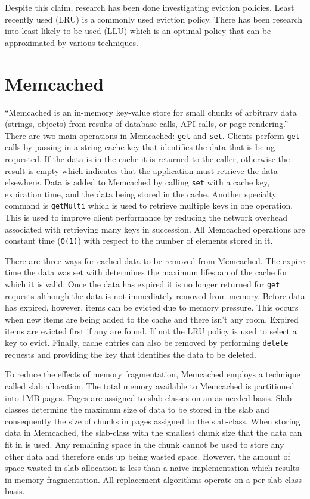 \documentclass[12pt]{ucthesis}
\begin{document}
Despite this claim, research has been done investigating eviction policies.
Least recently used (LRU) is a commonly used eviction policy.
There has been research into least likely to be used (LLU) which is an optimal policy that can be approximated by various techniques.


\section{Memcached}
``Memcached is an in-memory key-value store for small chunks of arbitrary data (strings, objects) from results of database calls, API calls, or page rendering.''\cite{memcachedDotOrg}
There are two main operations in Memcached: {\tt get} and {\tt set}.
Clients perform {\tt get} calls by passing in a string cache key that identifies the data that is being requested.
If the data is in the cache it is returned to the caller, otherwise the result is empty which indicates that the application must retrieve the data elsewhere.
Data is added to Memcached by calling {\tt set} with a cache key, expiration time, and the data being stored in the cache.
Another specialty command is {\tt getMulti} which is used to retrieve multiple keys in one operation.
This is used to improve client performance by reducing the network overhead associated with retrieving many keys in succession.
All Memcached operations are constant time ({\tt O(1)}) with respect to the number of elements stored in it.

There are three ways for cached data to be removed from Memcached.
The expire time the data was set with determines the maximum lifespan of the cache for which it is valid.
Once the data has expired it is no longer returned for {\tt get} requests although the data is not immediately removed from memory.
Before data has expired, however, items can be evicted due to memory pressure.
This occurs when new items are being added to the cache and there isn't any room.
Expired items are evicted first if any are found.
If not the LRU policy is used to select a key to evict.
Finally, cache entries can also be removed by performing {\tt delete} requests and providing the key that identifies the data to be deleted.

To reduce the effects of memory fragmentation, Memcached employs a technique called slab allocation.
The total memory available to Memcached is partitioned into 1MB pages.
Pages are assigned to slab-classes on an as-needed basis.
Slab-classes determine the maximum size of data to be stored in the slab and consequently the size of chunks in pages assigned to the slab-class.
When storing data in Memcached, the slab-class with the smallest chunk size that the data can fit in is used.
Any remaining space in the chunk cannot be used to store any other data and therefore ends up being wasted space.
However, the amount of space wasted in slab allocation is less than a naive implementation which results in memory fragmentation. %
All replacement algorithms operate on a per-slab-class basis.
\end{document}
